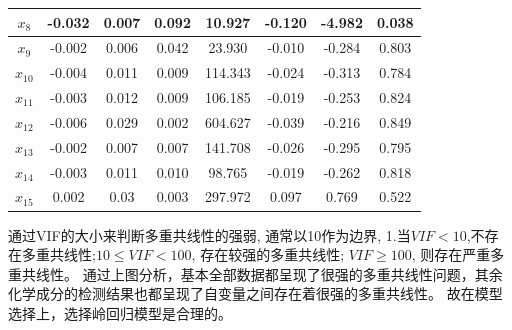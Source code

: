 \documentclass[UTF8]{ctexart}
\begin{document}
\begin{table}[H]
\begin{tabular}{|c|c|c|c|c|c|c|c|}
                        $x_{8}$               & -0.032                             & 0.007                            & 0.092                           & 10.927             & -0.120                  & -4.982 & 0.038 \\ \hline
                        $x_{9}$               & -0.002                             & 0.006                            & 0.042                           & 23.930             & -0.010                  & -0.284 & 0.803 \\ \hline
                        $x_{10}$              & -0.004                             & 0.011                            & 0.009                           & 114.343            & -0.024                  & -0.313 & 0.784 \\ \hline
                        $x_{11}$              & -0.003                             & 0.012                            & 0.009                           & 106.185            & -0.019                  & -0.253 & 0.824 \\ \hline
                        $x_{12}$              & -0.006                             & 0.029                            & 0.002                           & 604.627            & -0.039                  & -0.216 & 0.849 \\ \hline
                        $x_{13}$              & -0.002                             & 0.007                            & 0.007                           & 141.708            & -0.026                  & -0.295 & 0.795 \\ \hline
                        $x_{14}$              & -0.003                             & 0.011                            & 0.010                           & 98.765             & -0.019                  & -0.262 & 0.818 \\ \hline
                        $x_{15}$              & 0.002                              & 0.03                             & 0.003                           & 297.972            & 0.097                   & 0.769  & 0.522 \\ \hline
                    \end{tabular}
                \end{table}

                通过VIF的大小来判断多重共线性的强弱, 通常以10作为边界, 1.当$VIF<10$,不存在多重共线性;$10 \leq VIF<100$, 存在较强的多重共线性; $VIF \geq 100$, 则存在严重多重共线性。
                通过上图分析，基本全部数据都呈现了很强的多重共线性问题，其余化学成分的检测结果也都呈现了自变量之间存在着很强的多重共线性。
                故在模型选择上，选择岭回归模型是合理的。
\end{document}
